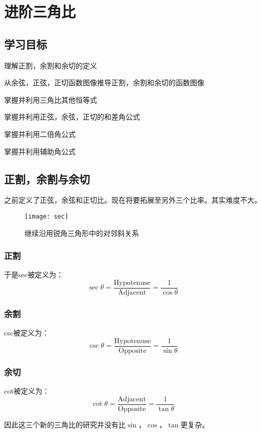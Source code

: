 \chapter{进阶三角比}
\label{ch:Further Trig}

\section*{学习目标}
\begin{todolist}
 \item 理解正割，余割和余切的定义
 \item 从余弦，正弦，正切函数图像推导正割，余割和余切的函数图像
 \item 掌握并利用三角比其他恒等式
 \item 掌握并利用正弦，余弦，正切的和差角公式
 \item 掌握并利用二倍角公式
 \item 掌握并利用辅助角公式
\end{todolist}
\clearpage

\section{正割，余割与余切}
之前定义了正弦，余弦和正切比。现在将要拓展至另外三个比率。其实难度不大。
\begin{figure}[H]
\centering
\texttt{[image: sec]}
\caption{继续沿用锐角三角形中的对邻斜关系}
\end{figure}

\subsection*{正割}
于是\gls{sec}被定义为：
\[
	\sec \theta=\frac{\text{Hypotenuse}}{\text{Adjacent}}=\frac{1}{\cos \theta}
\]

\subsection*{余割}
\gls{csc}被定义为：
\[
	\csc \theta=\frac{\text{Hypotenuse}}{\text{Opposite}}=\frac{1}{\sin \theta}
\]

\subsection*{余切}
\gls{cot}被定义为：
\[
	\cot \theta=\frac{\text{Adjacent}}{\text{Opposite}}=\frac{1}{\tan \theta}
\]

因此这三个新的三角比的研究并没有比$\sin$，$\cos$，$\tan$更复杂。

